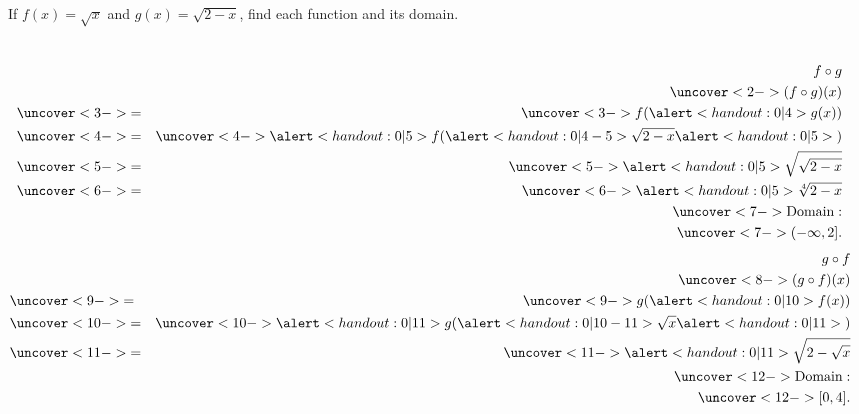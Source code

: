 \begin{frame}
\begin{example}
If \alert<handout:0| 5,10>{$f(x) = \sqrt{x}$} and \alert<handout:0| 4,11,15-16>{$g(x) = \sqrt{2 - x}$}, find each function and its domain.
\begin{columns}[t]
\begin{eqnarray*}
& & f\circ g \\
& & \uncover<2->{(f\circ g)(x)}\\
& \uncover<3->{ = } & \uncover<3->{f(\alert<handout:0| 4>{g(x)})}\\
& \uncover<4->{ = } & \uncover<4->{\alert<handout:0| 5>{f(}\alert<handout:0| 4-5>{\sqrt{2 - x}}\alert<handout:0| 5>{)}}\\
& \uncover<5->{ = } & \uncover<5->{\alert<handout:0| 5>{\sqrt{\sqrt{2-x}}}}\\
& \uncover<6->{ = } & \uncover<6->{\alert<handout:0| 5>{\sqrt[4]{2-x}}}\\
&& \uncover<7->{
\textrm{Domain}:}\\
&& \uncover<7->{
(-\infty , 2].
}
\end{eqnarray*}
\begin{eqnarray*}
& &  g \circ f  \\
& & \uncover<8->{(g\circ f)(x)}\\
& \uncover<9->{ = } & \uncover<9->{g(\alert<handout:0| 10>{f(x)})}\\
& \uncover<10->{ = } & \uncover<10->{\alert<handout:0| 11>{g(}\alert<handout:0| 10-11>{\sqrt{x}}\alert<handout:0| 11>{)}}\\
& \uncover<11->{ = } & \uncover<11->{\alert<handout:0| 11>{\sqrt{2 - \sqrt{x}}}}\\
&& \uncover<12->{
\textrm{Domain}:}\\
&& \uncover<12->{
[0 , 4].
}
\end{eqnarray*}

\end{columns}
\end{example}
\end{frame}
